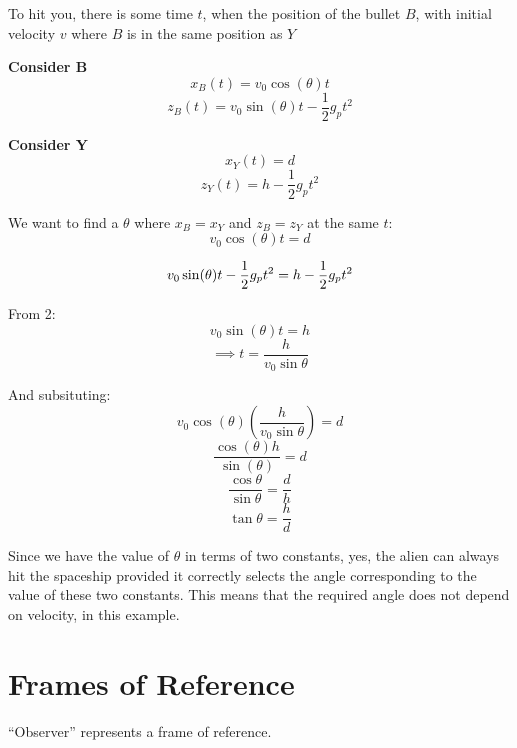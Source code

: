 To hit you, there is some time $t$, when the position of the bullet $B$, with initial velocity $v$ where $B$ is in the same position as $Y$

\textbf{Consider B}
\[
    x_B(t) = v_0 \cos (\theta)t 
\]
\[
    z_B(t) = v_0 \sin(\theta)t - \frac{1}{2}g_p t^2
\]

\textbf{Consider Y}
\[
    x_Y(t) = d
\]
\[
    z_Y(t) = h - \frac{1}{2}g_p t^2
\]

We want to find a $\theta$ where $x_B = x_Y$ and $z_B = z_Y$ at the same $t$:
\begin{equation}
    v_0 \cos(\theta)t = d
\end{equation}

\begin{equation}
    v_0 \sin(\theta)t - \frac{1}{2}g_p t^2 = h - \frac{1}{2}g_p t^2\\
\end{equation}

From 2:
\[
    v_0 \sin(\theta)t = h
\]
\[
    \implies t = \frac{h}{v_0 \sin \theta}
\]

And subsituting:
\[
    v_0 \cos(\theta) \left(\frac{h}{v_0 \sin \theta}\right) = d
\]
\[
    \frac{\cos(\theta) h}{\sin(\theta)} = d
\]
\[
    \frac{\cos \theta}{\sin \theta} = \frac{d}{h}
\]
\[
    \tan \theta = \frac{h}{d}
\]



Since we have the value of $\theta$ in terms of two constants, yes, the alien can always hit the spaceship provided it correctly selects the angle corresponding to the value of these two constants. This means that the required angle does not depend on velocity, in this example.


\section*{Frames of Reference}
``Observer'' represents a frame of reference.



